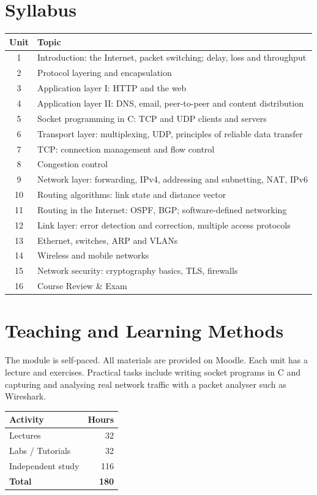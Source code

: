 \documentclass[11pt,a4paper]{article}
\begin{document}
\section{Syllabus}
\begin{tabularx}{\textwidth}{c X}
\toprule
\textbf{Unit} & \textbf{Topic} \\
\midrule
1  & Introduction: the Internet, packet switching; delay, loss and throughput \\
2  & Protocol layering and encapsulation \\
3  & Application layer I: HTTP and the web \\
4  & Application layer II: DNS, email, peer-to-peer and content distribution \\
5  & Socket programming in C: TCP and UDP clients and servers \\
6  & Transport layer: multiplexing, UDP, principles of reliable data transfer \\
7  & TCP: connection management and flow control \\
8  & Congestion control \\
9  & Network layer: forwarding, IPv4, addressing and subnetting, NAT, IPv6 \\
10 & Routing algorithms: link state and distance vector \\
11 & Routing in the Internet: OSPF, BGP; software-defined networking \\
12 & Link layer: error detection and correction, multiple access protocols \\
13 & Ethernet, switches, ARP and VLANs \\
14 & Wireless and mobile networks \\
15 & Network security: cryptography basics, TLS, firewalls \\
16 & Course Review \& Exam \\
\bottomrule
\end{tabularx}

\section{Teaching and Learning Methods}
The module is self-paced. All materials are provided on Moodle.
Each unit has a lecture and exercises. Practical tasks include writing socket
programs in C and capturing and analysing real network traffic with a packet analyser
such as Wireshark.

\begin{tabularx}{0.6\textwidth}{X r}
\toprule
\textbf{Activity} & \textbf{Hours} \\
\midrule
Lectures            & 32 \\
Labs / Tutorials    & 32 \\
Independent study   & 116 \\
\midrule
\textbf{Total}      & \textbf{180} \\
\bottomrule
\end{tabularx}
\end{document}
